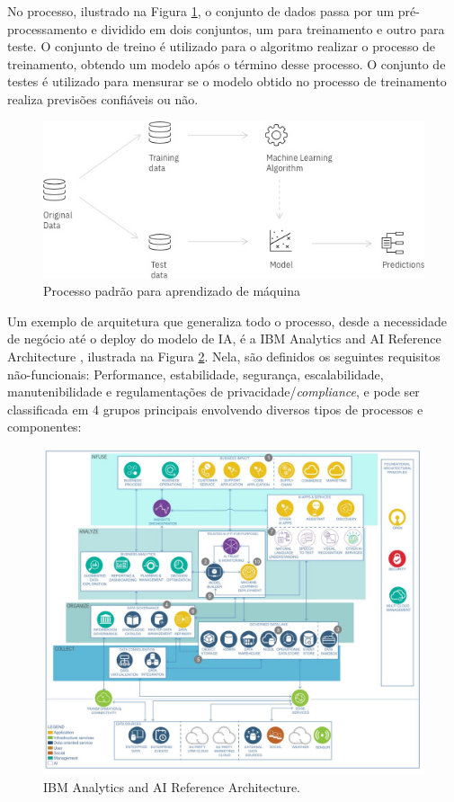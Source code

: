\documentclass[portugues]{ic-tese}
\begin{document}
No processo, ilustrado na Figura \ref{fig:MLProcess}, o conjunto de dados passa por um pré-processamento e dividido em dois conjuntos, um para treinamento e outro para teste. O conjunto de treino é utilizado para o algoritmo realizar o processo de treinamento, obtendo um modelo após o término desse processo. O conjunto de testes é utilizado para mensurar se o modelo obtido no processo de treinamento realiza previsões confiáveis ou não.

\begin{figure}[h]
\centering
\includegraphics[scale=0.5]{images/ML_Process.jpg}
\caption {Processo padrão para aprendizado de máquina}
\label{fig:MLProcess}
\end{figure}

Um exemplo de arquitetura que generaliza todo o processo, desde a necessidade de negócio até o deploy do modelo de IA, é a IBM Analytics and AI Reference Architecture \citep{IBM_2021}, ilustrada na Figura \ref{fig:AIReferenceArchitecture}. Nela, são definidos os seguintes requisitos não-funcionais: Performance, estabilidade, segurança, escalabilidade, manutenibilidade e regulamentações de privacidade/\textit{compliance}, e pode ser classificada em 4 grupos principais envolvendo diversos tipos de processos e componentes:

\begin{figure}[h]
\centering
\includegraphics[scale=0.25]{images/ai-analytics-ref-diagram-analyze.jpg}
\caption {IBM Analytics and AI Reference Architecture.}
\label{fig:AIReferenceArchitecture}
\end{figure}
\end{document}
